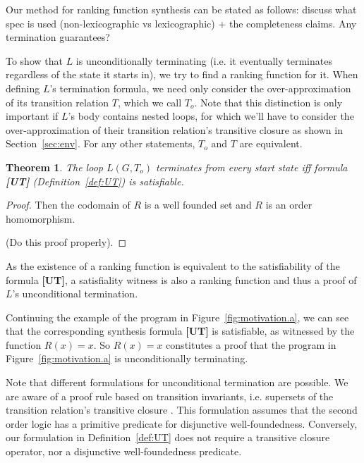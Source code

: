 \documentclass[preprint]{sigplanconf}
\newtheorem{theorem}{Theorem}
\theoremstyle{definition}
\begin{document}
Our method for ranking function synthesis can be stated as follows:
discuss what spec is used (non-lexicographic vs lexicographic) + the completeness claims.
Any termination guarantees?  
\fi


To show that $L$ is unconditionally terminating (i.e. it eventually terminates regardless of the
state it starts in), we try to find a ranking function for it. When defining $L$'s termination 
formula, we need only consider the over-approximation of its transition relation $T$, which we call $T_o$.
Note that this distinction is only important if $L$'s body contains nested loops, for which we'll have to 
consider the over-approximation of their transition relation's transitive closure
as shown in Section~\ref{sec:env}. For any other statements, $T_o$ and $T$ are equivalent.

\begin{theorem}
\label{thm:ut}
 The loop $L(G, T_o)$ terminates from every start state iff formula {\bf [UT]} (Definition~\ref{def:UT}) is
 satisfiable.
\end{theorem}

\begin{proof}
 Then the codomain of $R$ is a well founded set and $R$ is an order homomorphism.

 (Do this proof properly).
\end{proof}

As the existence of a ranking function is equivalent to the satisfiability
of the formula {\bf [UT]}, a satisfiality witness 
is also a ranking function and thus a proof of $L$'s unconditional termination.

Continuing the example of the program in Figure~\ref{fig:motivation.a}, we can see that
the corresponding synthesis formula {\bf [UT]} is satisfiable, as witnessed by the function $R(x) = x$.
So $R(x) = x$ constitutes a proof that the program in Figure~\ref{fig:motivation.a} is unconditionally
terminating.

Note that different formulations for unconditional termination are possible. We are aware of a proof rule based on 
transition invariants, i.e. supersets of the transition relation's transitive closure \cite{DBLP:conf/pldi/GrebenshchikovLPR12}.
This formulation assumes that the second order logic has a primitive predicate for disjunctive well-foundedness. 
Conversely, our formulation in Definition~\ref{def:UT} does not require a transitive closure operator, nor a disjunctive well-foundedness predicate. \\
\end{document}
